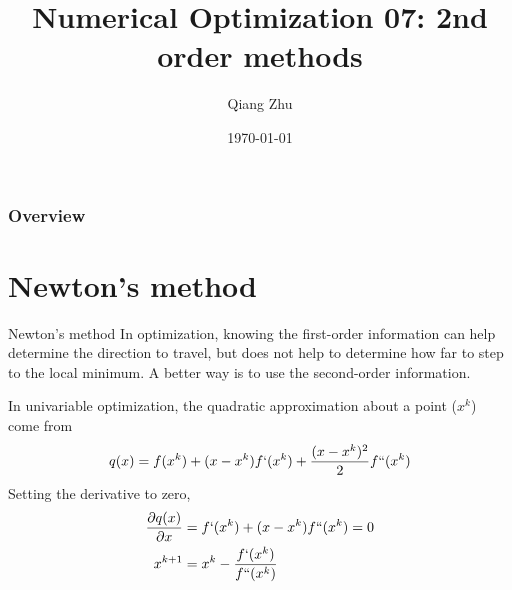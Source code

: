\documentclass{beamer}
\title[Gradient Descent]{Numerical Optimization 07: 2nd order methods} %
\author{Qiang Zhu} %
\institute[University of Nevada Las Vegas] %
{
University of Nevada Las Vegas\\ %
\medskip
}
\date{\today} %
\begin{document}
\begin{frame}
\titlepage %
\end{frame}

\begin{frame}
\frametitle{Overview} %
\tableofcontents %
\end{frame}



\section{Newton's method}
\begin{frame}{Newton's method}
In optimization, knowing the first-order information can help determine the direction to travel, but does not help to determine how far to step to the local minimum. A better way is to use the second-order information.

In univariable optimization, the quadratic approximation about a point ($x^k$) come from 
\begin{equation*}
    q(x) = f(x^k) + (x-x^k)f`(x^k) + \frac{(x-x^k)^2}{2}f``(x^k)
\end{equation*} 
Setting the derivative to zero, 
\begin{equation*}
\begin{split}
		\frac{\partial q(x)}{\partial x} &= f`(x^k) + (x-x^k)f``(x^k) = 0 \\
		x^{k+1} &= x^k - \frac{f`(x^k)}{f``(x^k)}
\end{split}
\end{equation*}

\end{frame}
\end{document}
